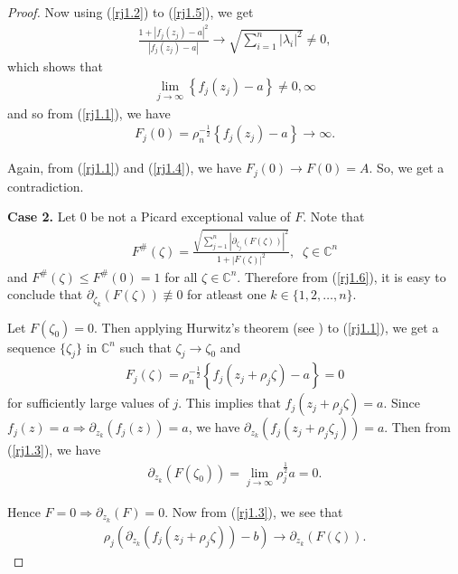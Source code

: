 \documentclass[11pt, reqno]{amsart}
\newtheorem*{cor A}{Corollary A}
\newtheorem*{cor B}{Corollary B}
\numberwithin{equation}{section}
\begin{document}
\begin{proof}
Now using (\ref{rj1.2}) to (\ref{rj1.5}), we get
\begin{align*}
\frac{1+|f_j(z_j)-a|^2}{|f_j(z_j)-a|}\rightarrow \sqrt{\sum\limits_{i=1}^n|\lambda_i|^2}\neq 0,
\end{align*}
which shows that
\begin{align*}
\lim\limits_{j\to \infty}\left\lbrace f_j(z_j)-a\right\rbrace\neq 0, \infty
\end{align*}
and so from (\ref{rj1.1}), we have
\begin{align*} 
F_j(0)=\rho_n^{-\frac{1}{2}}\left\lbrace f_j(z_j)-a\right\rbrace\to \infty.
\end{align*}

Again, from (\ref{rj1.1}) and (\ref{rj1.4}), we have $F_j(0)\to F(0)=A$. So, we get a contradiction.

\smallskip
{\bf Case 2.} Let $0$ be not a Picard exceptional value of $F$. Note that
\begin{align}\label{rj1.6} 
F^{\#}(\zeta)=\frac{\sqrt{\sum\limits_{j=1}^n|\partial_{\zeta_j}(F(\zeta))|^2}}{1+|F(\zeta)|^2},\;\;\zeta\in\mathbb{C}^n
\end{align}
and $F^{\#}(\zeta)\leq F^{\#}(0)=1$ for all $\zeta\in\mathbb{C}^n$. Therefore from (\ref{rj1.6}), it is easy to conclude that $\partial_{\zeta_k}(F(\zeta))\not\equiv 0$ for atleast one $k\in\{1,2,\ldots,n\}$.

Let $F(\zeta_0)=0$. Then applying Hurwitz's theorem (see \cite{PVD3}) to (\ref{rj1.1}), we get a sequence $\{\zeta_j\}$ in $\mathbb{C}^n$ such that $\zeta_j\rightarrow \zeta_0$ and 
\begin{align*}
F_j(\zeta)=\rho_n^{-\frac{1}{2}}\left\lbrace f_j(z_j+\rho_j \zeta)-a\right\rbrace=0
\end{align*}
for sufficiently large values of $j$. This implies that $f_j(z_j+\rho_j \zeta)=a$. Since $f_j(z)=a\Rightarrow \partial_{z_k}(f_j(z))=a$, we have $\partial_{z_k}(f_j(z_j+\rho_j \zeta_j))=a$. Then from (\ref{rj1.3}), we have
\begin{align*}
\partial_{z_k}(F(\zeta_0))=\lim\limits_{j\to\infty} \rho_j^{\frac{1}{2}} a=0.
\end{align*}

Hence $F=0\Rightarrow \partial_{z_k}(F)=0$. 
Now from (\ref{rj1.3}), we see that 
\begin{align}\label{rj1.7} 
\rho_{j}\left(\partial_{z_k}(f_j(z_{j}+\rho_{j}\zeta))-b\right)\rightarrow \partial_{z_k}(F(\zeta)).
\end{align}


\end{proof}
\end{document}
